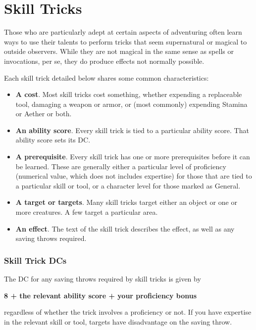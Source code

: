 \chapter{Skill Tricks}
\label{ch:skill-tricks}

Those who are particularly adept at certain aspects of adventuring often learn ways to use their talents to perform tricks that seem supernatural or magical to outside observers. While they are not magical in the same sense as spells or invocations, per se, they do produce effects not normally possible.

Each skill trick detailed below shares some common characteristics:
\begin{itemize}
	\item \textbf{A cost}. Most skill tricks cost something, whether expending a replaceable tool, damaging a weapon or armor, or (most commonly) expending Stamina or Aether or both.
	\item \textbf{An ability score}. Every skill trick is tied to a particular ability score. That ability score sets its DC.
	\item \textbf{A prerequisite}. Every skill trick has one or more prerequisites before it can be learned. These are generally either a particular level of proficiency (numerical value, which does not includes expertise) for those that are tied to a particular skill or tool, or a character level for those marked as General.
	\item \textbf{A target or targets}. Many skill tricks target either an object or one or more creatures. A few target a particular area.
	\item \textbf{An effect}. The text of the skill trick describes the effect, as well as any saving throws required.
\end{itemize}

\subsection{Skill Trick DCs}
The DC for any saving throws required by skill tricks is given by

\begin{center}
\textbf{8 + the relevant ability score + your proficiency bonus}
\end{center}

regardless of whether the trick involves a proficiency or not. If you have expertise in the relevant skill or tool, targets have disadvantage on the saving throw.

